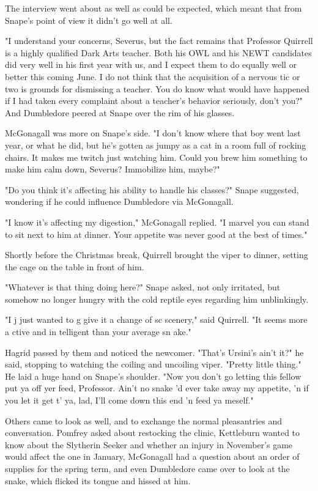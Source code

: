 The interview went about as well as could be expected, which meant that from Snape's point of view it didn't go well at all.

"I understand your concerns, Severus, but the fact remains that Professor Quirrell is a highly qualified Dark Arts teacher. Both his OWL and his NEWT candidates did very well in his first year with us, and I expect them to do equally well or better this coming June. I do not think that the acquisition of a nervous tic or two is grounds for dismissing a teacher. You do know what would have happened if I had taken every complaint about a teacher's behavior seriously, don't you?" And Dumbledore peered at Snape over the rim of his glasses.

McGonagall was more on Snape's side. "I don't know where that boy went last year, or what he did, but he's gotten as jumpy as a cat in a room full of rocking chairs. It makes me twitch just watching him. Could you brew him something to make him calm down, Severus? Immobilize him, maybe?"

"Do you think it's affecting his ability to handle his classes?" Snape suggested, wondering if he could influence Dumbledore via McGonagall.

"I know it's affecting my digestion," McGonagall replied. "I marvel you can stand to sit next to him at dinner. Your appetite was never good at the best of times."

Shortly before the Christmas break, Quirrell brought the viper to dinner, setting the cage on the table in front of him.

"Whatever is that thing doing here?" Snape asked, not only irritated, but somehow no longer hungry with the cold reptile eyes regarding him unblinkingly.

"I j{\el} just wanted to g{\el} give it a change of sc{\el} scenery," said Quirrell. "It seems more a{\el} ctive and in{\el} telligent than your average sn{\el} ake."

Hagrid passed by them and noticed the newcomer. "That's Ursini's ain't it?" he said, stopping to watching the coiling and uncoiling viper. "Pretty little thing." He laid a huge hand on Snape's shoulder. "Now you don't go letting this fellow put ya off yer feed, Professor. Ain't no snake 'd ever take away my appetite, 'n if you let it get t' ya, lad, I'll come down this end 'n feed ya meself."

Others came to look as well, and to exchange the normal pleasantries and conversation. Pomfrey asked about restocking the clinic, Kettleburn wanted to know about the Slytherin Seeker and whether an injury in November's game would affect the one in January, McGonagall had a question about an order of supplies for the spring term, and even Dumbledore came over to look at the snake, which flicked its tongue and hissed at him.

